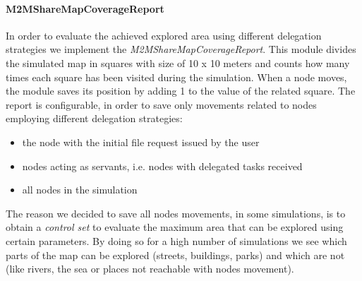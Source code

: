\paragraph{M2MShareMapCoverageReport}
In order to evaluate the achieved explored area using different delegation strategies we implement the \textit{M2MShareMapCoverageReport}. This module divides the simulated map in squares with size of 10 x 10 meters and counts how many times each square has been visited during the simulation. When a node moves, the module saves its position by adding 1 to the value of the related square. The report is configurable, in order to save only movements related to nodes employing different delegation strategies:
\begin{itemize}
\item the node with the initial file request issued by the user
\item nodes acting as servants, i.e. nodes with delegated tasks received
\item all nodes in the simulation
\end{itemize}
The reason we decided to save all nodes movements, in some simulations, is to obtain a \textit{control set} to evaluate the maximum area that can be explored using certain parameters. By doing so for a high number of simulations we see which parts of the map can be explored (streets, buildings, parks) and which are not (like rivers, the sea or places not reachable with nodes movement).

%


